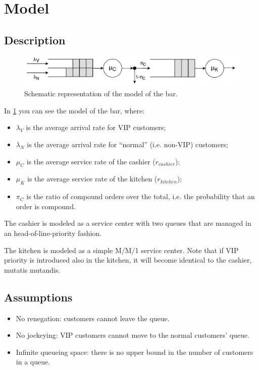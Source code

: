 \section{Model}

\subsection{Description}
\begin{figure}[h!]
    \centering
    \includegraphics[width=\textwidth]{figs/qt_model.pdf}
    \caption{Schematic representation of the model of the bar.}
    \label{fig:model}
\end{figure}

In \cref{fig:model} you can see the model of the bar, where:
\begin{itemize}
    \item $\lambda_V$ is the average arrival rate for VIP customers;
    \item $\lambda_N$ is the average arrival rate for ``normal'' (i.e. non-VIP) customers;
    \item $\mu_C$ is the average service rate of the cashier ($r_{cashier}$);
    \item $\mu_K$ is the average service rate of the kitchen ($r_{kitchen}$);
    \item $\pi_C$ is the ratio of compound orders over the total, i.e. the 
        probability that an order is compound.
\end{itemize}

The cashier is modeled as a service center with two queues that are managed 
in an head-of-line-priority fashion.

The kitchen is modeled as a simple M/M/1 service center. Note that if VIP 
priority is introduced also in the kitchen, it will become identical to the 
cashier, mutatis mutandis.

\subsection{Assumptions}
\begin{itemize}
    \item No renegation: customers cannot leave the queue.
    \item No jockeying: VIP customers cannot move to the normal customers' queue.
    \item Infinite queueing space: there is no upper bound in the number of 
        customers in a queue.
\end{itemize}

